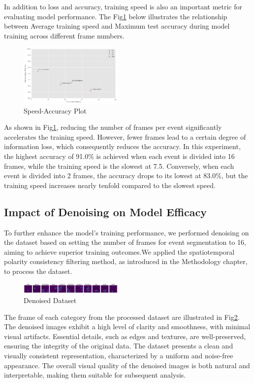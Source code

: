 \documentclass[conference]{IEEEtran}
\begin{document}
In addition to loss and accuracy, training speed is also an important metric 
for evaluating model performance. The Fig\ref{fig:speed-accuracy} below 
illustrates the relationship between Average training speed and Maximum test accuracy 
during model training across different frame numbers.
\begin{figure}
    \centering
    \includegraphics[width=0.45\textwidth]{figure/Accuracy_speed.png}
    \caption{Speed-Accuracy Plot}
    \label{fig:speed-accuracy}
\end{figure}

As shown in Fig\ref{fig:speed-accuracy}, reducing the number of frames per event significantly accelerates the training speed. 
However, fewer frames lead to a certain degree of information loss, which consequently reduces the accuracy. 
In this experiment, the highest accuracy of 91.0\% is achieved when each event is divided into 16 frames, 
while the training speed is the slowest at 7.5. 
Conversely, when each event is divided into 2 frames, the accuracy drops to its lowest at 83.0\%, 
but the training speed increases nearly tenfold compared to the slowest speed.

\subsection{Impact of Denoising on Model Efficacy}
To further enhance the model's training performance, we performed denoising on the dataset based on setting the number of frames for event segmentation to 16, 
aiming to achieve superior training outcomes.We applied the spatiotemporal polarity consistency filtering method, 
as introduced in the Methodology chapter, to process the dataset. 
\begin{figure}[htbp]
    \centering
    \includegraphics[width=0.45\textwidth]{figure/denoise.png}
    \caption{Denoised Dataset}
    \label{fig:denoise}
\end{figure}
The frame of each category from the processed dataset are illustrated in Fig\ref{fig:denoise}. 
The denoised images exhibit a high level of clarity and smoothness, with minimal visual artifacts. 
Essential details, such as edges and textures, are well-preserved, ensuring the integrity of the original data. 
The dataset presents a clean and visually consistent representation, characterized by a uniform and noise-free appearance. 
The overall visual quality of the denoised images is both natural and interpretable, making them suitable for subsequent analysis.
\end{document}
